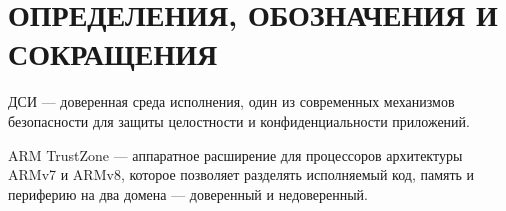 \section*{ОПРЕДЕЛЕНИЯ, ОБОЗНАЧЕНИЯ И СОКРАЩЕНИЯ}

ДСИ --- доверенная среда исполнения, один из современных механизмов безопасности для защиты целостности и конфиденциальности приложений.

ARM TrustZone --- аппаратное расширение для процессоров архитектуры ARMv7 и ARMv8, которое позволяет разделять исполняемый код, память и периферию на два домена --- доверенный и недоверенный.